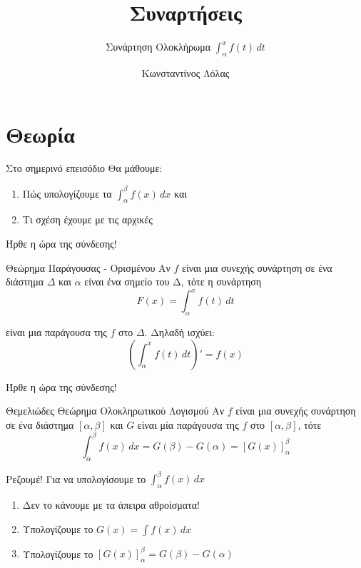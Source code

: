 \documentclass{presentation}
\title{Συναρτήσεις}
\subtitle{Συνάρτηση Ολοκλήρωμα $\int_α^x f(t)\, dt$}
\author[Λόλας]{Κωνσταντίνος Λόλας}
\institute[$10^ο$ ΓΕΛ]{$10^ο$ ΓΕΛ Θεσσαλονίκης}
\date{}
\begin{document}
\begin{frame}
    \titlepage
\end{frame}

\section{Θεωρία}

\begin{frame}{Στο σημερινό επεισόδιο}
    Θα μάθουμε:
    \begin{enumerate}
        \item Πώς υπολογίζουμε τα $\int_α^β f(x)\, dx$ και
        \item Τι σχέση έχουμε με τις αρχικές
    \end{enumerate}
\end{frame}

\begin{frame}{Ήρθε η ώρα της σύνδεσης!}
    \begin{block}{Θεώρημα Παράγουσας - Ορισμένου}
        Αν $f$ είναι μια συνεχής συνάρτηση σε ένα διάστημα $Δ$ και $α$ είναι ένα σημείο του Δ, τότε η συνάρτηση
        $$F(x)=\int_α^x f(t) \, dt$$

        είναι μια παράγουσα της $f$ στο $Δ$. Δηλαδή ισχύει:
        $$\left( \int_α^x f(t) \, dt \right)'=f(x)$$
    \end{block}
\end{frame}

\begin{frame}{Ήρθε η ώρα της σύνδεσης!}
    \begin{block}{Θεμελιώδες Θεώρημα Ολοκληρωτικού Λογισμού}
        Αν $f$ είναι μια συνεχής συνάρτηση σε ένα διάστημα $[α,β]$ και $G$ είναι μία παράγουσα της $f$ στο $[α,β]$, τότε
        $$\int_α^β f(x) \, dx=G(β)-G(α)=\left[ G(x) \right]_α^β $$
    \end{block}
\end{frame}

\begin{frame}{Ρεζουμέ!}
    Για να υπολογίσουμε το $\int_α^β f(x)\, dx$
    \begin{enumerate}[<+->]
        \item Δεν το κάνουμε με τα άπειρα αθροίσματα!
        \item Υπολογίζουμε το $G(x)=\int f(x)\, dx$
        \item Υπολογίζουμε το $\left[ G(x) \right]_α^β=G(β)-G(α) $
    \end{enumerate}
\end{frame}
\end{document}
